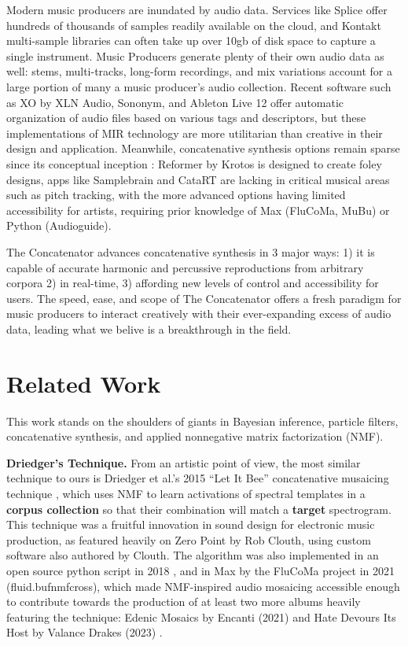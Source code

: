 \documentclass{article}
\begin{document}
Modern music producers are inundated by audio data. Services like Splice offer hundreds of thousands of samples readily available on the cloud, and Kontakt multi-sample libraries can often take up over 10gb of disk space to capture a single instrument. Music Producers generate plenty of their own audio data as well: stems, multi-tracks, long-form recordings, and mix variations account for a large portion of many a music producer's audio collection. Recent software such as XO by XLN Audio, Sononym, and Ableton Live 12 offer automatic organization of audio files based on various tags and descriptors, but these implementations of MIR technology are more utilitarian than creative in their design and application. Meanwhile, concatenative synthesis options remain sparse since its conceptual inception \cite{schwarz2000system}: Reformer by Krotos is designed to create foley designs, apps like Samplebrain and CataRT \cite{schwarz2006real, schwarz2008principles} are lacking in critical musical areas such as pitch tracking, with the more advanced options having limited accessibility for artists, requiring prior knowledge of Max (FluCoMa, MuBu) or Python (Audioguide).

The Concatenator advances concatenative synthesis in 3 major ways: 1) it is capable of accurate harmonic and percussive reproductions from arbitrary corpora 2) in real-time, 3) affording new levels of control and accessibility for users. The speed, ease, and scope of The Concatenator offers a fresh paradigm for music producers to interact creatively with their ever-expanding excess of audio data, leading what we belive is a breakthrough in the field.

\section{Related Work}
\label{sec:relatedwork}
This work stands on the shoulders of giants in Bayesian inference, particle filters, concatenative synthesis, and applied nonnegative matrix factorization (NMF).

\textbf{Driedger's Technique.} From an artistic point of view, the most similar technique to ours is Driedger et al.'s 2015 ``Let It Bee'' concatenative musaicing technique \cite{driedger2015let}, which uses NMF to learn activations of spectral templates in a \textbf{corpus collection} so that their combination will match a \textbf{target} spectrogram. This technique was a fruitful innovation in sound design for electronic music production, as featured heavily on Zero Point by Rob Clouth\cite{clouth2020}, using custom software also authored by Clouth. The algorithm was also implemented in an open source python script in 2018 \cite{tralie2018}, and in Max by the FluCoMa project in 2021 (fluid.bufnmfcross)\cite{flucoma2021}, which made NMF-inspired audio mosaicing accessible enough to contribute towards the production of at least two more albums heavily featuring the technique: Edenic Mosaics by Encanti (2021) \cite{cantil2021} and Hate Devours Its Host by Valance Drakes (2023) \cite{drakes2023}.
\end{document}
